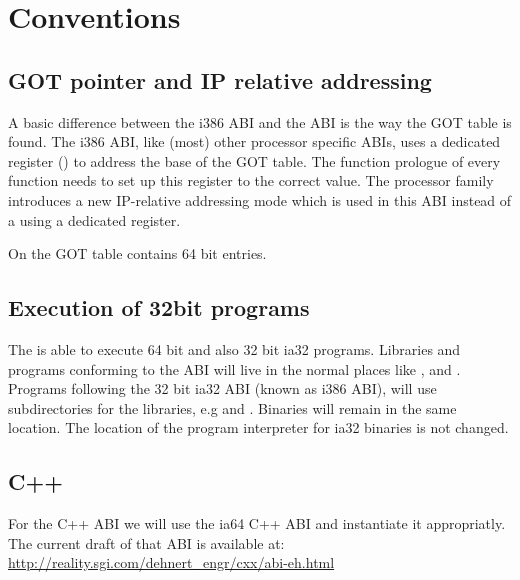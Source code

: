 
\chapter{Conventions}



\section{GOT pointer and IP relative addressing}

A basic difference between the i386 ABI and the \xARCH ABI is the
way the GOT table is found.  The i386 ABI, like (most) other processor
specific ABIs, uses a dedicated register () to address the
base of the GOT table.  The function prologue of every function needs
to set up this register to the correct value.  The \xARCH processor
family introduces a new IP-relative addressing mode which is used in
this ABI instead of a using a dedicated register.

On \xARCH the GOT table contains 64 bit entries.

\section{Execution of 32bit programs}


The \xARCH is able to execute 64 bit \xARCH and also 32 bit ia32
programs.  Libraries and programs conforming to the \xARCH ABI will
live in the normal places like ,  and
.  Programs following the 32 bit ia32 ABI (known as
i386 ABI), will use  subdirectories for the libraries, e.g
 and .  Binaries will remain in
the same location.  The location of the program interpreter for ia32
binaries is not changed.


\section{C++}

For the C++ ABI we will use the ia64 C++ ABI and instantiate it
appropriatly.  The current draft of that ABI is available at:\\
\url{http://reality.sgi.com/dehnert_engr/cxx/abi-eh.html}


